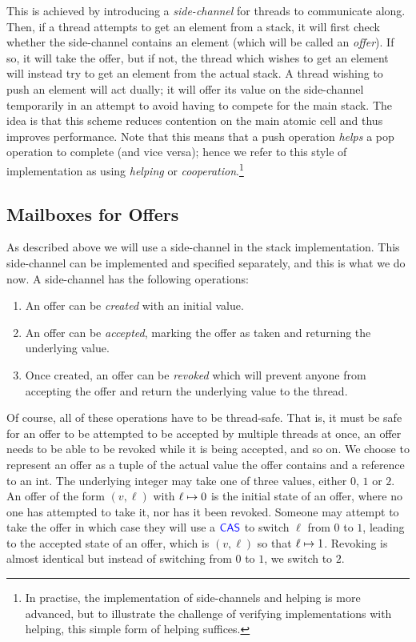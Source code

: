 This is achieved by introducing a \emph{side-channel} for threads to
communicate along.  Then, if a thread attempts to get an element from
a stack, it will first check whether the side-channel contains an
element (which will be called an \emph{offer}).  If so, it will take
the offer, but if not, the thread which wishes to get an element will
instead try to get an element from the actual stack.  A thread wishing
to push an element will act dually; it will offer its value on the
side-channel temporarily in an attempt to avoid having to compete for
the main stack.  The idea is that this scheme reduces contention on
the main atomic cell and thus improves performance.  Note that this
means that a push operation \emph{helps} a pop operation to complete
(and vice versa); hence we refer to this style of implementation as
using \emph{helping} or \emph{cooperation}.\footnote{In practise, the
  implementation of side-channels and helping is more advanced, but to illustrate
  the challenge of verifying implementations with helping, this simple
  form of helping suffices.}

\subsection{Mailboxes for Offers}
As described above we will use a side-channel in the stack implementation.
This side-channel can be implemented and specified separately, and this is what we do now.
A side-channel has the following operations:
\begin{enumerate}
\item An offer can be \emph{created} with an initial value.
\item An offer can be \emph{accepted}, marking the offer as taken and returning the underlying value.
\item Once created, an offer can be \emph{revoked} which will prevent anyone from accepting the offer and return the underlying value to the thread.
\end{enumerate}
Of course, all of these operations have to be thread-safe. That is, it
must be safe for an offer to be attempted to be accepted by multiple
threads at once, an offer needs to be able to be revoked while it is
being accepted, and so on. We choose to represent an offer as a tuple
of the actual value the offer contains and a reference to an int. The
underlying integer may take one of three values, either $0$, $1$ or
$2$. An offer of the form $(v, \ell)$ with $\ell \mapsto 0$
is the initial state of an offer, where no one has attempted to take it, nor
has it been revoked. Someone may attempt to take the offer in which
case they will use a $\textsf{\color{blue} CAS}$ to switch $\ell$ from $0$ to $1$, leading to
the accepted state of an offer, which is $(v, \ell)$ so that
$\ell \mapsto 1$.  Revoking is almost identical but instead of
switching from $0$ to $1$, we switch to $2$.

